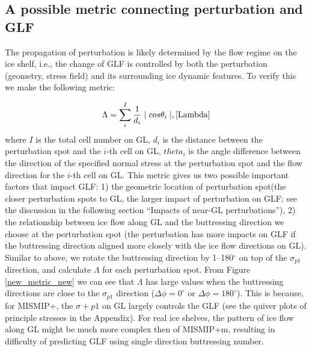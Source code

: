 \documentclass[review,oneside]{igs}
\begin{document}
\subsection{A possible metric connecting perturbation and GLF}

The propagation of perturbation is likely determined by the flow regime on the ice shelf, i.e., the change of GLF is controlled by both the perturbation (geometry, stress field) and its surrounding ice dynamic features. To verify this we make the following metric:

\begin{equation}
    \Lambda = \sum_i^I \frac{1}{d_i}\mid cos\theta_i \mid,
    \ref{Lambda}
\end{equation}
where $I$ is the total cell number on GL, $d_i$ is the distance between the perturbation spot and the $i$-th cell on GL, $theta_i$ is the angle difference between the direction of the specified normal stress at the perturbation spot and the flow direction for the $i$-th cell on GL. This metric gives us two possible important factors that impact GLF: 1) the geometric location of perturbation spot(the closer perturbation spots to GL, the larger impact of perturbation on GLF; see the discussion in the following section ``Impacts of near-GL perturbations''), 2) the relationship between ice flow along GL and the buttressing direction we choose at the perturbation spot (the perturbation has more impacts on GLF if the buttressing direction aligned more closely with the ice flow directions on GL).  
Similar to above, we rotate the buttressing direction by 1--180$^\circ$ on top of the $\sigma_{p1}$ direction, and calculate $\Lambda$ for each perturbation spot. From Figure \ref{new_metric_new} we can see that $\Lambda$ has large values when the buttressing directions are close to the $\sigma_{p1}$ direction ($\Delta\phi=0^\circ$ or $\Delta\phi=180^\circ$). This is because, for MISMIP+, the $\sigma+{p1}$ on GL largely controls the GLF (see the quiver plots of principle stresses in the Appendix). For real ice shelves, the pattern of ice flow along GL might be much more complex then of MISMIP+m, resulting in difficulty of predicting GLF using single direction buttressing number.  
\end{document}
